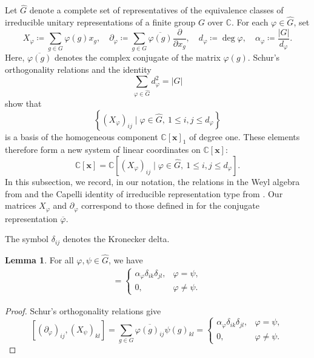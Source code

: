 \documentclass[12pt,a4paper]{article}
\theoremstyle{definition}
\newtheorem{lem}[definition]{Lemma}
\numberwithin{definition}{section}
\begin{document}
Let $\widehat G$ denote a complete set of representatives of the equivalence classes
of irreducible unitary representations of a finite group $G$ over $\mathbb C$.
For each $\varphi\in\widehat G$, set
\[
X_{\varphi} \coloneqq \sum_{g \in G} \varphi(g) x_{g}, \quad
\partial_{\varphi} \coloneqq \sum_{g \in G} \overline{\varphi(g)} \frac{\partial}{\partial x_{g}}, \quad
d_{\varphi} \coloneqq \deg{\varphi}, \quad
\alpha_{\varphi} \coloneqq \frac{|G|}{d_{\varphi}}.
\]
Here, $\overline{\varphi(g)}$ denotes the complex conjugate of the matrix $\varphi(g)$.
Schur's orthogonality relations and the identity
\[
\sum_{\varphi \in \widehat{G}} d_{\varphi}^2 = |G|
\]
show that
\[
\left\{
(X_{\varphi})_{i j}
\mid
\varphi \in \widehat{G}, \
1 \leq i, j \leq d_{\varphi}
\right\}
\]
is a basis of the homogeneous component $\mathbb C[\bm x]_1$ of degree one.
These elements therefore form a new system of linear coordinates on
$\mathbb C[\bm x]$:
\[
\mathbb{C}[\bm{x}]
=
\mathbb{C}[(X_{\varphi})_{i j}
\mid
\varphi \in \widehat{G}, \ 
1 \leq i, j \leq d_{\varphi}].
\]
In this subsection, we record, in our notation, the relations in the Weyl algebra
from \cite[Section~3]{MR3841213} and the Capelli identity of irreducible representation type
from \cite[Theorem~10]{MR3841213}.
Our matrices $X_\varphi$ and $\partial_\varphi$ correspond to those defined
in \cite{MR3841213} for the conjugate representation $\overline\varphi$.

The symbol $\delta_{ij}$ denotes the Kronecker delta.

\begin{lem}\label{lem:2.4}
For all $\varphi,\psi\in\widehat G$, we have
\begin{align*}
[(\partial_\varphi)_{ij},(X_\psi)_{kl}]
=
\begin{cases}
\alpha_\varphi\delta_{ik}\delta_{jl},
&\varphi=\psi,\\
0, &\varphi\ne\psi.
\end{cases}
\end{align*}
\end{lem}
\begin{proof}
Schur's orthogonality relations give
\[
 [(\partial_\varphi)_{ij},(X_\psi)_{kl}]
 =
 \sum_{g\in G}
 \overline{\varphi(g)_{ij}}\psi(g)_{kl}
 =
 \begin{cases}
  \alpha_\varphi\delta_{ik}\delta_{jl},
    & \varphi=\psi,\\
  0,
    & \varphi\ne\psi.
 \end{cases}
\]
\end{proof}
\end{document}
